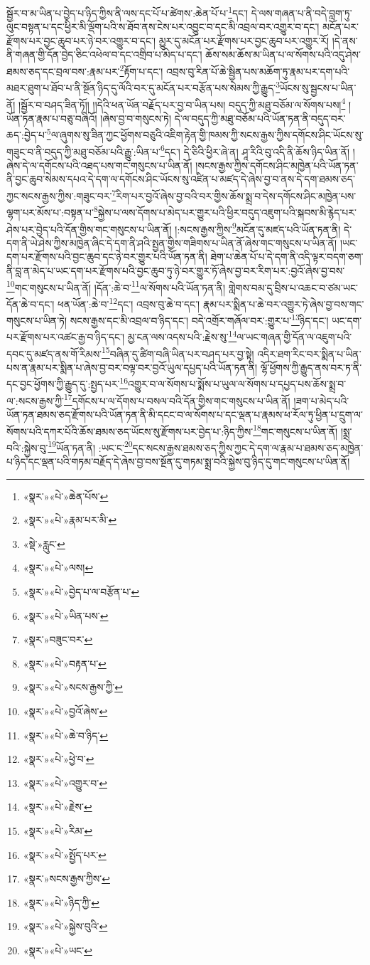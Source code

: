 སྦྱོར་བ་མ་ཡིན་པ་བྱེད་པ་ཉིད་ཀྱིས་ནི་ལས་དང་པོ་པ་ཚེགས་:ཆེན་པོ་པ་\footnote{«སྣར་»«པེ་»ཆེན་པོས་}དང་། དེ་ལས་གཞན་པ་ནི་བདེ་བླག་ཏུ་ལུང་བསྟན་པ་དང་ཕྱིར་མི་ལྡོག་པའི་ས་ཐོབ་ནས་ངེས་པར་འབྱུང་བ་དང་མི་འབྲལ་བར་འགྱུར་བ་དང་། མངོན་པར་རྫོགས་པར་བྱང་ཆུབ་པར་ཉེ་བར་འགྱུར་བ་དང་། མྱུར་དུ་མངོན་པར་རྫོགས་པར་བྱང་ཆུབ་པར་འགྱུར་རོ། །དེ་ནས་ནི་གཞན་གྱི་དོན་བྱེད་ཅིང་འཕེལ་བ་དང་འགྲིབ་པ་མེད་པ་དང་། ཆོས་སམ་ཆོས་མ་ཡིན་པ་ལ་སོགས་པའི་འདུ་ཤེས་ཐམས་ཅད་དང་བྲལ་བས་:རྣམ་པར་\footnote{«སྣར་»«པེ་»རྣམ་པར་མི་}རྟོག་པ་དང་། འབྲས་བུ་རིན་པོ་ཆེ་སྦྱིན་པས་མཆོག་ཏུ་རྣམ་པར་དག་པའི་མཐར་ཐུག་པ་ཐོབ་པ་ནི་སྔོན་ཉིད་དུ་ལོའི་བར་དུ་མངོན་པར་བརྩོན་པས་སེམས་ཀྱི་རྒྱུད་\footnote{«སྡེ་»རླུང་}ཡོངས་སུ་སྦྱངས་པ་ཡིན་ནོ། །སྦྱོར་བ་བཤད་ཟིན་ཏོ།། །།དེའི་ཕན་ཡོན་བརྗོད་པར་བྱ་བ་ཡིན་པས། བདུད་ཀྱི་མཐུ་བཅོམ་ལ་སོགས་པས།\footnote{«སྣར་»«པེ་»ལས།} །ཡོན་ཏན་རྣམ་པ་བཅུ་བཞིའོ། །ཞེས་བྱ་བ་གསུངས་ཏེ། དེ་ལ་བདུད་ཀྱི་མཐུ་བཅོམ་པའི་ཡོན་ཏན་ནི་བདུད་བར་ཆད་:བྱེད་པ་\footnote{«སྣར་»«པེ་»བྱེད་པ་ལ་བརྩོན་པ་}ལ་ཞུགས་སུ་ཟིན་ཀྱང་ཕྱོགས་བཅུའི་འཇིག་རྟེན་གྱི་ཁམས་ཀྱི་སངས་རྒྱས་ཀྱིས་དགོངས་ཤིང་ཡོངས་སུ་གཟུང་བ་ནི་བདུད་ཀྱི་མཐུ་བཅོམ་པའི་རྒྱུ་:ཡིན་པ་\footnote{«སྣར་»«པེ་»ཡིན་པས་}དང་། དེ་ཅིའི་ཕྱིར་ཞེ་ན། ཤཱ་རིའི་བུ་འདི་ནི་ཆོས་ཉིད་ཡིན་ནོ། །ཞེས་དེ་ལ་དགོངས་པའི་འཐད་པས་གང་གསུངས་པ་ཡིན་ནོ། །སངས་རྒྱས་ཀྱིས་དགོངས་ཤིང་མཁྱེན་པའི་ཡོན་ཏན་ནི་བྱང་ཆུབ་སེམས་དཔའ་དེ་དག་ལ་དགོངས་ཤིང་ཡོངས་སུ་འཛིན་པ་མཛད་དེ་ཞེས་བྱ་བ་ནས་དེ་དག་ཐམས་ཅད་ཀྱང་སངས་རྒྱས་ཀྱིས་:གཟུང་བར་\footnote{«སྣར་»བཟུང་བར་}རིག་པར་བྱའོ་ཞེས་བྱ་བའི་བར་གྱིས་ཆོས་སྨྲ་བ་དེས་དགོངས་ཤིང་མཁྱེན་པས་ལྷག་པར་མོས་པ་:བསྟན་པ་\footnote{«སྣར་»«པེ་»བརྟན་པ་}སྐྱེས་པ་ལས་དོགས་པ་མེད་པར་གྱུར་པའི་ཕྱིར་བདུད་འཇུག་པའི་སྐབས་མི་རྙེད་པར་ཤེས་པར་བྱེད་པའི་དོན་གྱིས་གང་གསུངས་པ་ཡིན་ནོ། །:སངས་རྒྱས་ཀྱིས་\footnote{«སྣར་»«པེ་»སངས་རྒྱས་ཀྱི་}མངོན་དུ་མཛད་པའི་ཡོན་ཏན་ནི། དེ་དག་ནི་ཡེ་ཤེས་ཀྱིས་མཁྱེན་ཞིང་དེ་དག་ནི་ཤའི་སྤྱན་གྱིས་གཟིགས་པ་ཡིན་ནོ་ཞེས་གང་གསུངས་པ་ཡིན་ནོ། །ཡང་དག་པར་རྫོགས་པའི་བྱང་ཆུབ་དང་ཉེ་བར་གྱུར་པའི་ཡོན་ཏན་ནི། ཐེག་པ་ཆེན་པོ་པ་དེ་དག་ནི་འདི་ལྟར་བདག་ཅག་ནི་བླ་ན་མེད་པ་ཡང་དག་པར་རྫོགས་པའི་བྱང་ཆུབ་ཏུ་ཉེ་བར་གྱུར་ཏོ་ཞེས་བྱ་བར་རིག་པར་:བྱའོ་ཞེས་བྱ་བས་\footnote{«སྣར་»«པེ་»བྱའོ་ཞེས་}གང་གསུངས་པ་ཡིན་ནོ། །དོན་:ཆེ་བ་\footnote{«སྣར་»«པེ་»ཆེ་བ་ཉིད་}ལ་སོགས་པའི་ཡོན་ཏན་ནི། གླེགས་བམ་དུ་བྲིས་པ་འཆང་བ་ཙམ་ཡང་དོན་ཆེ་བ་དང་། ཕན་ཡོན་:ཆེ་བ་\footnote{«སྣར་»«པེ་»ཕྱེ་བ་}དང་། འབྲས་བུ་ཆེ་བ་དང་། རྣམ་པར་སྨིན་པ་ཆེ་བར་འགྱུར་ཏེ་ཞེས་བྱ་བས་གང་གསུངས་པ་ཡིན་ཏེ། སངས་རྒྱས་དང་མི་འབྲལ་བ་ཉིད་དང་། བདེ་འགྲོར་གཞོལ་བར་:གྱུར་པ་\footnote{«སྣར་»«པེ་»འགྱུར་བ་}ཉིད་དང་། ཡང་དག་པར་རྫོགས་པར་འཚང་རྒྱ་བ་ཉིད་དང་། མྱ་ངན་ལས་འདས་པའི་:རྗེས་སུ་\footnote{«སྣར་»«པེ་»རྗེས་}ལ་ཡང་གཞན་གྱི་དོན་ལ་འཇུག་པའི་དབང་དུ་མཛད་ནས་གོ་རིམས་\footnote{«སྣར་»«པེ་»རིམ་}བཞིན་དུ་ཚིག་བཞི་ཡིན་པར་བཤད་པར་བྱ་སྟེ། འདིར་ཐག་རིང་བར་སྨིན་པ་ཡིན་པས་ན་རྣམ་པར་སྨིན་པ་ཞེས་བྱ་བར་བལྟ་བར་བྱའོ་ཡུལ་དཔྱད་པའི་ཡོན་ཏན་ནི། ལྷོ་ཕྱོགས་ཀྱི་རྒྱུད་ནས་བར་ཏ་ནི་དང་བྱང་ཕྱོགས་ཀྱི་རྒྱུད་དུ་:སྤྱད་པར་\footnote{«སྣར་»«པེ་»སྤྱོད་པར་}འགྱུར་བ་ལ་སོགས་པ་སྨོས་པ་ཡུལ་ལ་སོགས་པ་དཔྱད་པས་ཆོས་སྨྲ་བ་ལ་:སངས་རྒྱས་ཀྱི་\footnote{«སྣར་»སངས་རྒྱས་ཀྱིས་}དགོངས་པ་ལ་དོགས་པ་བསལ་བའི་དོན་གྱིས་གང་གསུངས་པ་ཡིན་ནོ། །ཟག་པ་མེད་པའི་ཡོན་ཏན་ཐམས་ཅད་རྫོགས་པའི་ཡོན་ཏན་ནི་མི་དངང་བ་ལ་སོགས་པ་དང་ལྡན་པ་རྣམས་ཕ་རོལ་ཏུ་ཕྱིན་པ་དྲུག་ལ་སོགས་པའི་དཀར་པོའི་ཆོས་ཐམས་ཅད་ཡོངས་སུ་རྫོགས་པར་བྱེད་པ་:ཉིད་ཀྱིས་\footnote{«སྣར་»«པེ་»ཉིད་ཀྱི་}གང་གསུངས་པ་ཡིན་ནོ། །སྨྲ་བའི་:སྐྱེས་བུ་\footnote{«སྣར་»«པེ་»སྐྱེས་བུའི་}ཡོན་ཏན་ནི། :ཡང་ང་\footnote{«སྣར་»«པེ་»ཡང་}དང་སངས་རྒྱས་ཐམས་ཅད་ཀྱིས་ཀྱང་དེ་དག་ལ་རྣམ་པ་ཐམས་ཅད་མཁྱེན་པ་ཉིད་དང་ལྡན་པའི་གཏམ་བརྗོད་དེ་ཞེས་བྱ་བས་སྔོན་དུ་གཏམ་སྨྲ་བའི་སྐྱེས་བུ་ཉིད་དུ་གང་གསུངས་པ་ཡིན་ནོ། 